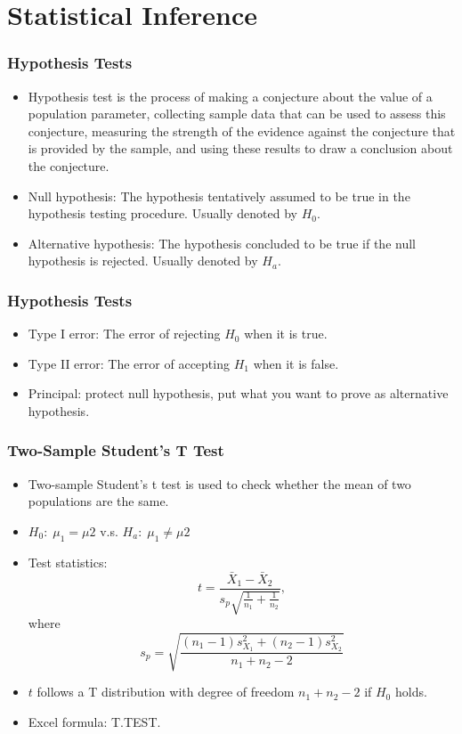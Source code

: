 \documentclass[11pt]{beamer}
\begin{document}
\section{Statistical Inference}

\begin{frame}
\frametitle{Hypothesis Tests}
\begin{itemize}
    \item Hypothesis test is the process of making a conjecture about the value of a population parameter, collecting sample data that can be used to assess this conjecture, measuring the strength of the evidence against the conjecture that is provided by the sample, and using these results to draw a conclusion about the conjecture.
    \item Null hypothesis: The hypothesis tentatively assumed to be true in the hypothesis testing procedure. Usually denoted by $H_0$.
    \item Alternative hypothesis: The hypothesis concluded to be true if the null hypothesis is rejected. Usually denoted by $H_a$.
\end{itemize}
\end{frame}

\begin{frame}
\frametitle{Hypothesis Tests}
\begin{itemize}
    \item Type I error: The error of rejecting $H_0$ when it is true.
    \item Type II error: The error of accepting $H_1$ when it is false.
    \item Principal: protect null hypothesis, put what you want to prove as alternative hypothesis.
\end{itemize}
\end{frame}

\begin{frame}
\frametitle{Two-Sample Student's T Test}
\begin{itemize}
    \item Two-sample Student's t test is used to check whether the mean of two populations are the same.
    \item $H_0: \; \mu_1=\mu2$ v.s. $H_a: \; \mu_1 \neq \mu2$
    \item Test statistics: $$t=\frac{\bar{X}_1-\bar{X}_2}{s_p\sqrt{\frac{1}{n_1}+\frac{1}{n_2}}},$$ where 
    $$s_p=\sqrt{\frac{(n_1-1)s^2_{X_1}+(n_2-1)s^2_{X_2}}{n_1+n_2-2}}$$
    \item $t$ follows a T distribution with degree of freedom $n_1+n_2-2$ if $H_0$ holds.
    \item Excel formula: T.TEST.
\end{itemize}
\end{frame}
\end{document}
